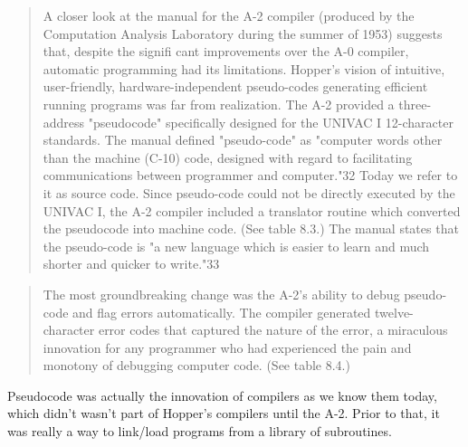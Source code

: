 \begin{quotation}
A closer look at the manual for the A-2 compiler (produced by the Computation 
Analysis Laboratory during the summer of 1953) suggests that, despite the 
signifi cant improvements over the A-0 compiler, automatic programming had its 
limitations.  Hopper's vision of intuitive, user-friendly, hardware-independent 
pseudo-codes generating efficient running programs was far from realization. 
The A-2 provided a three-address "pseudocode" specifically designed for the 
UNIVAC I 12-character standards. The manual defined "pseudo-code" as "computer 
words other than the machine (C-10) code, designed with regard to facilitating 
communications between programmer and computer."32 Today we refer to it as 
source code. Since pseudo-code could not be directly executed by the UNIVAC I, 
the A-2 compiler included a translator routine which converted the pseudocode 
into machine code. (See table 8.3.) The manual states that the pseudo-code is 
"a new language which is easier to learn and much shorter and quicker to 
write."33
\end{quotation}

\begin{quotation}
 The most groundbreaking change was the A-2's ability to debug
pseudo-code and flag errors automatically. The compiler generated twelve-character error codes that captured the nature of the
error, a miraculous innovation for any programmer who had
experienced the pain and monotony of debugging computer
code. (See table 8.4.)
\end{quotation}

Pseudocode was actually the innovation of compilers as we know them today,
which didn't wasn't part of Hopper's compilers until the A-2.
Prior to that, it was really a way to link/load programs from a library of subroutines.


